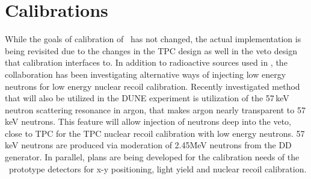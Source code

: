 \section{Calibrations}
\label{sec:Calib}


While the goals of calibration of \DSk\ has not changed, the actual implementation is being revisited due to the changes in the TPC design as well in the veto design that calibration interfaces to. In addition to radioactive sources used in \DSf, the collaboration has been investigating alternative ways of injecting low energy neutrons for low energy nuclear recoil calibration. Recently investigated method that will also be utilized in the DUNE experiment is utilization of the 57\,keV neutron scattering resonance in argon, that makes argon nearly transparent to 57\,keV neutrons. This feature will allow injection of neutrons deep into the veto, close to TPC for the TPC nuclear recoil calibration with low energy neutrons. 57\,keV neutrons are produced via moderation of 2.45\'MeV neutrons from the DD generator. %
In parallel, plans are being developed for the calibration needs of the \DSk\ prototype detectors for x-y positioning, light yield and nuclear recoil calibration.

